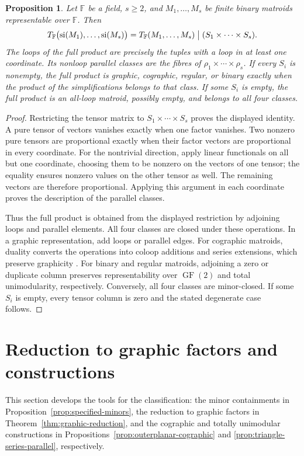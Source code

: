 \documentclass[12pt,a4paper]{article}
\numberwithin{equation}{section}
\newcommand{\F}{\mathbb F}
\newtheorem{proposition}[proposition]{Proposition}
\theoremstyle{definition}
\theoremstyle{remark}
\begin{document}
\begin{proposition}\label{prop:regular-simplification}
Let \(\F\) be a field, \(s\ge2\), and \(M_1,\ldots,M_s\) be finite
binary matroids representable over \(\F\).  Then
\[
 T_{\F}\bigl(\operatorname{si}(M_1),\ldots,\operatorname{si}(M_s)\bigr)
 =T_{\F}(M_1,\ldots,M_s)\bigm|(S_1\times\cdots\times S_s).
\]
The loops of the full product are precisely the tuples with a loop
in at least one coordinate.  Its nonloop parallel classes are the
fibres of \(\rho_1\times\cdots\times\rho_s\).
If every \(S_i\) is nonempty, the full product is graphic,
cographic, regular, or binary exactly when the product of the
simplifications belongs to that class.  If some \(S_i\) is empty,
the full product is an all-loop matroid, possibly empty, and belongs
to all four classes.
\end{proposition}
\begin{proof}
Restricting the tensor matrix to \(S_1\times\cdots\times S_s\)
proves the displayed identity.  A pure tensor of vectors vanishes
exactly when one factor vanishes.  Two nonzero pure tensors are
proportional exactly when their factor vectors are proportional in
every coordinate.  For the nontrivial direction, apply linear
functionals on all but one coordinate, choosing them to be nonzero
on the vectors of one tensor; the equality ensures nonzero values
on the other tensor as well.  The remaining vectors are therefore
proportional.  Applying this argument in each coordinate proves
the description of the parallel classes.

Thus the full product is obtained from the displayed restriction
by adjoining loops and parallel elements.  All four classes are
closed under these operations.  In a graphic representation, add
loops or parallel edges.  For cographic matroids, duality converts
the operations into coloop additions and series extensions, which
preserve graphicity \cite[Section~5.4]{oxley}.
For binary and regular matroids, adjoining a zero or duplicate column
preserves representability over \(\operatorname{GF}(2)\) and total
unimodularity, respectively.
Conversely, all four classes are minor-closed.  If some \(S_i\)
is empty, every tensor column is zero and the stated degenerate
case follows.
\end{proof}

\section{Reduction to graphic factors and constructions}\label{sec:positive-constructions}
This section develops the tools for the classification: the minor
containments in Proposition~\ref{prop:specified-minors}, the reduction
to graphic factors in Theorem~\ref{thm:graphic-reduction}, and the
cographic and totally unimodular constructions in
Propositions~\ref{prop:outerplanar-cographic} and
\ref{prop:triangle-series-parallel}, respectively.
\end{document}
